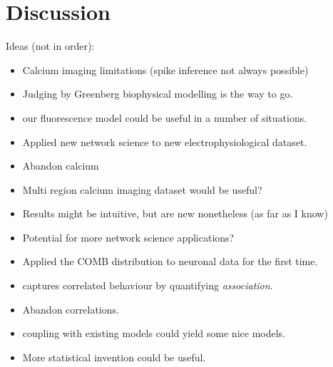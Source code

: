 \section{Discussion}
Ideas (not in order):
\begin{itemize}
  \item Calcium imaging limitations (spike inference not always possible)
  \item Judging by Greenberg biophysical modelling is the way to go.
  \item our fluorescence model could be useful in a number of situations.
  \item Applied new network science to new electrophysiological dataset.
  \item Abandon calcium
  \item Multi region calcium imaging dataset would be useful?
  \item Results might be intuitive, but are new nonetheless (as far as I know)
  \item Potential for more network science applications?
  \item Applied the COMB distribution to neuronal data for the first time.
  \item captures correlated behaviour by quantifying \textit{association}.
  \item Abandon correlations.
  \item coupling with existing models could yield some nice models.
  \item More statistical invention could be useful.
\end{itemize}
